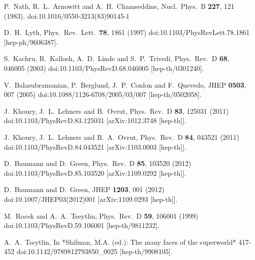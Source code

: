 \documentclass[12pt]{article}
\begin{document}
\begin{thebibliography}{99}
  P.~Nath, R.~L.~Arnowitt and A.~H.~Chamseddine,
  Nucl.\ Phys.\ B {\bf 227}, 121 (1983).
  doi:10.1016/0550-3213(83)90145-1

  D.~H.~Lyth,
  Phys.\ Rev.\ Lett.\  {\bf 78}, 1861 (1997)
  doi:10.1103/PhysRevLett.78.1861
  [hep-ph/9606387].

  S.~Kachru, R.~Kallosh, A.~D.~Linde and S.~P.~Trivedi,
  Phys.\ Rev.\ D {\bf 68}, 046005 (2003)
  doi:10.1103/PhysRevD.68.046005
  [hep-th/0301240].

  V.~Balasubramanian, P.~Berglund, J.~P.~Conlon and F.~Quevedo,
  JHEP {\bf 0503}, 007 (2005)
  doi:10.1088/1126-6708/2005/03/007
  [hep-th/0502058].

  J.~Khoury, J.~L.~Lehners and B.~Ovrut,
  Phys.\ Rev.\ D {\bf 83}, 125031 (2011)
  doi:10.1103/PhysRevD.83.125031
  [arXiv:1012.3748 [hep-th]].

  J.~Khoury, J.~L.~Lehners and B.~A.~Ovrut,
  Phys.\ Rev.\ D {\bf 84}, 043521 (2011)
  doi:10.1103/PhysRevD.84.043521
  [arXiv:1103.0003 [hep-th]].

  D.~Baumann and D.~Green,
  Phys.\ Rev.\ D {\bf 85}, 103520 (2012)
  doi:10.1103/PhysRevD.85.103520
  [arXiv:1109.0292 [hep-th]].

  D.~Baumann and D.~Green,
  JHEP {\bf 1203}, 001 (2012)
  doi:10.1007/JHEP03(2012)001
  [arXiv:1109.0293 [hep-th]].

  M.~Rocek and A.~A.~Tseytlin,
  Phys.\ Rev.\ D {\bf 59}, 106001 (1999)
  doi:10.1103/PhysRevD.59.106001
  [hep-th/9811232].

  A.~A.~Tseytlin,
  In *Shifman, M.A. (ed.): The many faces of the superworld* 417-452
  doi:10.1142/9789812793850\_0025
  [hep-th/9908105].


\end{thebibliography}
\end{document}
